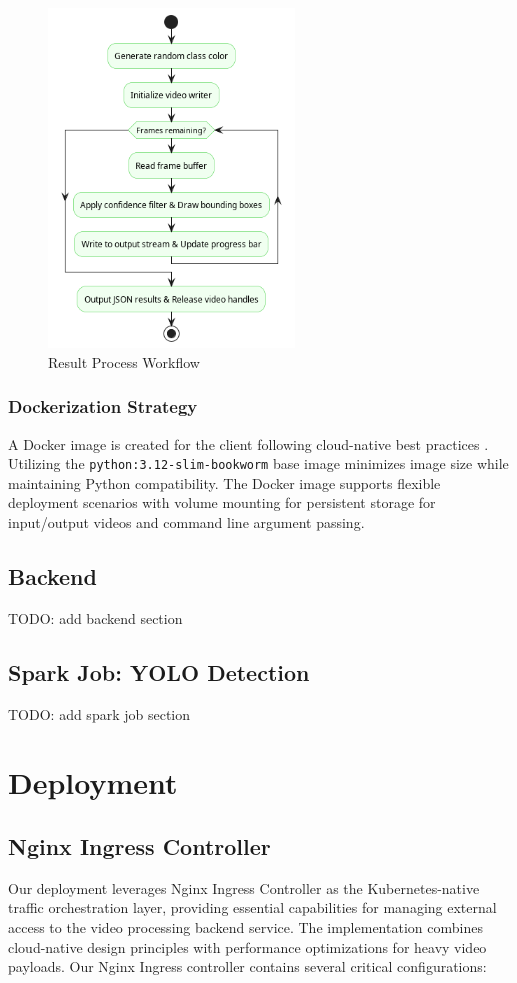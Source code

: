 \documentclass[10pt,a4paper]{article}
\begin{document}
\begin{figure}[htbp]
    \centering
    \includegraphics[height=9cm]{client-wf-render.png}
    \caption{Result Process Workflow}
    \label{fig:client-wf-render}
\end{figure}

\subsubsection{Dockerization Strategy}

A Docker image is created for the client following cloud-native best practices \cite{docker_best_practices}. Utilizing the \texttt{python:3.12-slim-bookworm} base image minimizes image size while maintaining Python compatibility. The Docker image supports flexible deployment scenarios with volume mounting for persistent storage for input/output videos and command line argument passing.

\subsection{Backend}

TODO: add backend section

\subsection{Spark Job: YOLO Detection}

TODO: add spark job section

\section{Deployment}
\subsection{Nginx Ingress Controller}
Our deployment leverages Nginx Ingress Controller \cite{nginx_ingress} as the Kubernetes-native traffic orchestration layer, providing essential capabilities for managing external access to the video processing backend service. The implementation combines cloud-native design principles with performance optimizations for heavy video payloads. Our Nginx Ingress controller contains several critical configurations:
\end{document}
